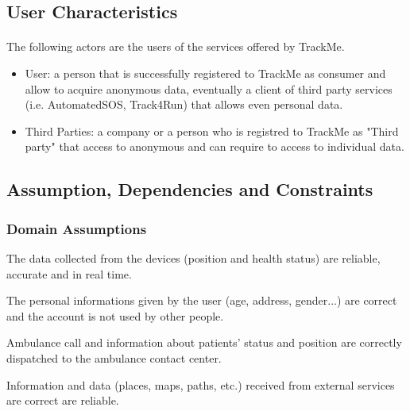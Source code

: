 \documentclass[a4paper]{article}
\begin{document}
    \subsection{User Characteristics}
    
    \paragraph{}The following actors are the users of the services offered by TrackMe. 
    
    
    \begin{itemize}
        \item User:  a person that is successfully registered to TrackMe as consumer and allow to acquire anonymous data, eventually a client of third party services (i.e. AutomatedSOS, Track4Run) that allows even personal data.
        
        \item Third Parties:  a company or a person who is registred to TrackMe as "Third party" that access to anonymous and can require to access to individual data.
        
    \end{itemize}
    
    \subsection{Assumption, Dependencies and Constraints}
    
    \subsubsection{Domain Assumptions}
    
    
    \begin{enumerate}[label={[D.\arabic*]}]
        
        \item The data collected from the devices (position and health status) are reliable, accurate and in real time.
        \item The personal informations given by the user (age, address, gender...) are correct and the account is not used by other people. 
        \item Ambulance call and information about patients' status and position are correctly dispatched to the ambulance contact center.
        \item Information and data (places, maps, paths, etc.) received from external services are correct are reliable.
        
    \end{enumerate}
    
\end{document}
